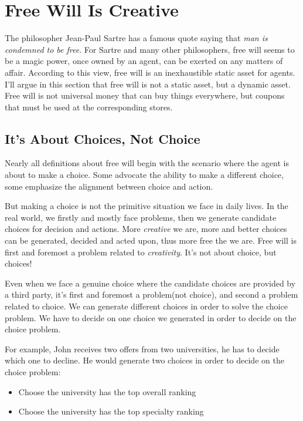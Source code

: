 \section{Free Will Is Creative}

The philosopher Jean-Paul Sartre has a famous quote saying that \emph{man is condemned to be free}. For Sartre and many other philosophers, free will seems to be a magic power, once owned by an agent, can be exerted on any matters of affair. According to this view, free will is an inexhaustible static asset for agents. I'll argue in this section that free will is not a static asset, but a dynamic asset. Free will is not universal money that can buy things everywhere, but coupons that must be used at the corresponding stores.

\subsection{It's About Choices, Not Choice}

Nearly all definitions about free will begin with the scenario where the agent is about to make a choice. Some advocate the ability to make a different choice, some emphasize the alignment between choice and action.

But making a choice is not the primitive situation we face in daily lives. In the real world, we firstly and mostly face problems, then we generate candidate choices for decision and actions. More \emph{creative} we are, more and better choices can be generated, decided and acted upon, thus more free the we are. Free will is first and foremost a problem related to \emph{creativity}. It's not about choice, but choices!

Even when we face a genuine choice where the candidate choices are provided by a third party, it's first and foremost a problem(not choice), and second a problem related to choice. We can generate different choices in order to solve the choice problem. We have to decide on one choice we generated in order to decide on the choice problem.

For example, John receives two offers from two universities, he has to decide which one to decline. He would generate two choices in order to decide on the choice problem:

\begin{itemize}
\item Choose the university has the top overall ranking
\item Choose the university has the top specialty ranking
\end{itemize}


